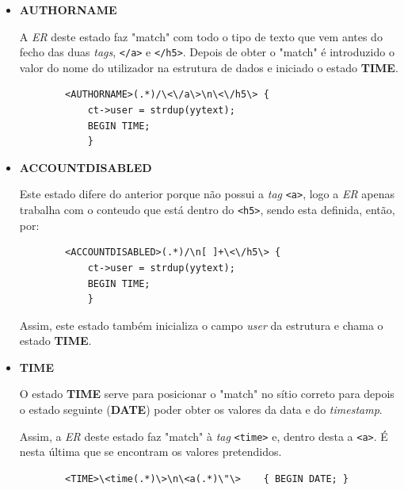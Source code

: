 \documentclass[a4paper,12pt]{report}
\newcommand*{\xml}[1]{\texttt{<#1>}}
\begin{document}
\vspace{1cm}

\begin{itemize}
    \item 
    \textbf{AUTHORNAME}
    \par A \textit{ER} deste estado faz "match" com todo o tipo de texto que vem antes do fecho das duas \textit{tags}, \xml{/a} e \xml{/h5}. Depois de obter o "match" é introduzido o valor do nome do utilizador na estrutura de dados e iniciado o estado \textbf{TIME}.
    
    \begin{verbatim}
        <AUTHORNAME>(.*)/\<\/a\>\n\<\/h5\> {
            ct->user = strdup(yytext);
            BEGIN TIME;
            }
    \end{verbatim}{}
\end{itemize}

\begin{itemize}
    \item 
    \textbf{ACCOUNTDISABLED}
    \par Este estado difere do anterior porque não possui a \textit{tag} \xml{a}, logo a \textit{ER} apenas trabalha com o conteudo que está dentro do \xml{h5}, sendo esta definida, então, por:

    \begin{verbatim}
        <ACCOUNTDISABLED>(.*)/\n[ ]+\<\/h5\> {
            ct->user = strdup(yytext);
            BEGIN TIME;
            }   
    \end{verbatim}
    
    Assim, este estado também inicializa o campo \textit{user} da estrutura e chama o estado \textbf{TIME}.
\end{itemize}

\vspace{1cm}

\begin{itemize}
    \item 
    \textbf{TIME}
    \par O estado \textbf{TIME} serve para posicionar o "match" no sítio correto para depois o estado seguinte (\textbf{DATE}) poder obter os valores da data e do \textit{timestamp}.
    \par Assim, a \textit{ER} deste estado faz "match" à \textit{tag} \xml{time} e, dentro desta a \xml{a}. É nesta última que se encontram os valores pretendidos.
    
    \begin{verbatim}
        <TIME>\<time(.*)\>\n\<a(.*)\"\>    { BEGIN DATE; }
    \end{verbatim}
\end{itemize}
\end{document}
